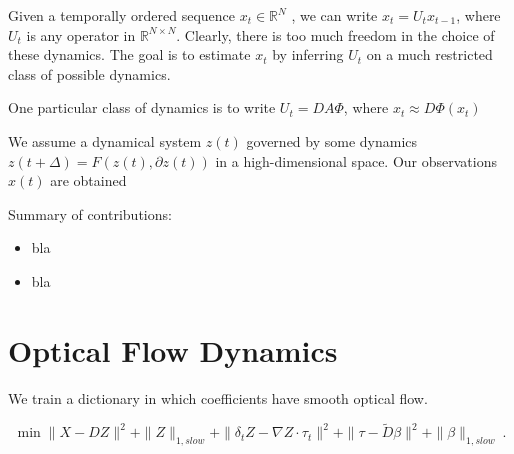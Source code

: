\documentclass[11pt]{article} %
\begin{document}
Given a temporally ordered sequence $x_t \in \mathbb{R}^N$ , we can 
write $x_t = U_{t} x_{t-1}$, where $U_t$ is any operator in $\mathbb{R}^{N \times N}$.
Clearly, there is too much freedom in the choice of these dynamics. The 
goal is to estimate $x_t$ by inferring $U_t$ on a much restricted class of possible dynamics.

One particular class of dynamics is to write $U_t = D A \Phi$, where 
$x_t \approx D \Phi(x_t)$

We assume a dynamical system $z(t)$ governed by some dynamics 
$z(t+\Delta) = F( z(t), \partial z(t))$ in a high-dimensional space. 
Our observations $x(t)$ are obtained 


Summary of contributions:
\begin{itemize}
\item bla 
\item bla
\end{itemize}


\section{Optical Flow Dynamics}

We train a dictionary in which coefficients have smooth optical flow.

\begin{equation}
\min \| X - D Z \|^2  + \| Z \|_{1,slow} + \| \delta_t Z - \nabla Z \cdot \tau_t \|^2 + \| \tau - \widetilde{D} \beta \|^2 + \| \beta\|_{1,slow}   ~.
\end{equation}
\end{document}
